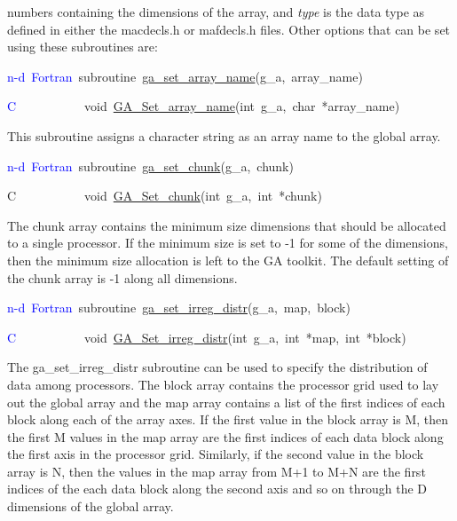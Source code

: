 numbers containing the dimensions of the array, and \emph{type} is
the data type as defined in either the macdecls.h or mafdecls.h files.
Other options that can be set using these subroutines are:
\begin{lyxcode}
\textcolor{blue}{n-d~Fortran}~subroutine~\href{http://www.emsl.pnl.gov/docs/global/ga_ops.html\#NGA_SET_ARRAY_NAME}{ga\_{}set\_{}array\_{}name}(g\_a,~array\_name)~

\textcolor{blue}{C}~~~~~~~~~~~void~\href{http://www.emsl.pnl.gov/docs/global/c_nga_ops.html\#GA_SET_ARRAY_NAME}{GA\_{}Set\_{}array\_{}name}(int~g\_a,~char~{*}array\_name)
\end{lyxcode}
This subroutine assigns a character string as an array name to the
global array.
\begin{lyxcode}
\textcolor{blue}{n-d~Fortran}~subroutine~\href{http://www.emsl.pnl.gov/docs/global/ga_ops.html\#NGA_SET_CHUNK}{ga\_{}set\_{}chunk}(g\_a,~chunk)~

C~~~~~~~~~~~void~\href{http://www.emsl.pnl.gov/docs/global/c_nga_ops.html\#GA_SET_CHUNK}{GA\_{}Set\_{}chunk}(int~g\_a,~int~{*}chunk)
\end{lyxcode}
The chunk array contains the minimum size dimensions that should be
allocated to a single processor. If the minimum size is set to -1
for some of the dimensions, then the minimum size allocation is left
to the GA toolkit. The default setting of the chunk array is -1 along
all dimensions.
\begin{lyxcode}
\textcolor{blue}{n-d~Fortran}~subroutine~\href{http://www.emsl.pnl.gov/docs/global/ga_ops.html\#NGA_SET_IRREG_DISTR}{ga\_{}set\_{}irreg\_{}distr}(g\_a,~map,~block)~

\textcolor{blue}{C}~~~~~~~~~~~void~\href{http://www.emsl.pnl.gov/docs/global/c_nga_ops.html\#GA_SET_IRREG_DISTR}{GA\_{}Set\_{}irreg\_{}distr}(int~g\_a,~int~{*}map,~int~{*}block)
\end{lyxcode}
The ga\_set\_irreg\_distr subroutine can be used to specify the distribution
of data among processors. The block array contains the processor grid
used to lay out the global array and the map array contains a list
of the first indices of each block along each of the array axes. If
the first value in the block array is M, then the first M values in
the map array are the first indices of each data block along the first
axis in the processor grid. Similarly, if the second value in the
block array is N, then the values in the map array from M+1 to M+N
are the first indices of the each data block along the second axis
and so on through the D dimensions of the global array.
